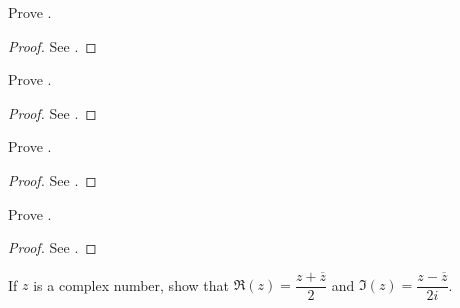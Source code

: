 \exercisesection

\begin{ex}\label{ii:ex:4.6.1}
  Prove .
\end{ex}

\begin{proof}
  See .
\end{proof}

\begin{ex}\label{ii:ex:4.6.2}
  Prove .
\end{ex}

\begin{proof}
  See .
\end{proof}

\begin{ex}\label{ii:ex:4.6.3}
  Prove .
\end{ex}

\begin{proof}
  See .
\end{proof}

\begin{ex}\label{ii:ex:4.6.4}
  Prove .
\end{ex}

\begin{proof}
  See .
\end{proof}

\begin{ex}\label{ii:ex:4.6.5}
  If \(z\) is a complex number, show that \(\Re(z) = \dfrac{z + \overline{z}}{2}\) and \(\Im(z) = \dfrac{z - \overline{z}}{2i}\).
\end{ex}

